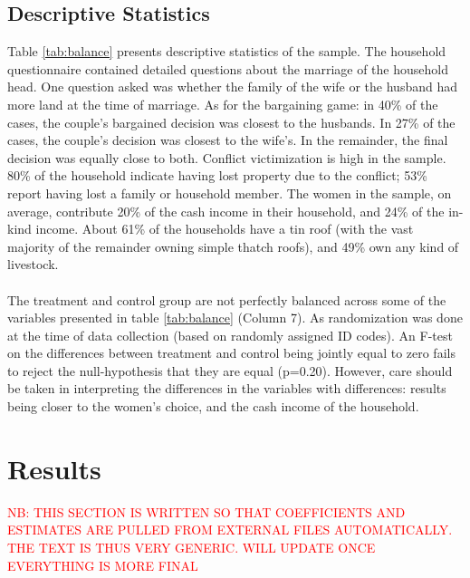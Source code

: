 \documentclass[11pt,a4paper]{scrartcl} %
\newcommand{\tableloc}{C:/Users/Koen/Dropbox/PhD/Papers/CongoGBV/Tables}
\begin{document}
\subsection*{Descriptive Statistics}
Table \ref{tab:balance} presents descriptive statistics of the sample. The household questionnaire contained detailed questions about the marriage of the household head. One question asked was whether the family of the wife or the husband had more land at the time of marriage.  As for the bargaining game: in 40\% of the cases, the couple's bargained decision was closest to the husbands. In 27\% of the cases, the couple's decision was closest to the wife's. In the remainder, the final decision was equally close to both. Conflict victimization is high in the sample. 80\% of the household indicate having lost property due to the conflict; 53\% report having lost a family or household member. The women in the sample, on average, contribute 20\% of the cash income in their household, and 24\% of the in-kind income. About 61\% of the households have a tin roof (with the vast majority of the remainder owning simple thatch roofs), and 49\% own any kind of livestock.

\paragraph{}
The treatment and control group are not perfectly balanced across some of the variables presented in table \ref{tab:balance} (Column 7). As randomization was done at the time of data collection (based on randomly assigned ID codes). An F-test on the differences between treatment and control being jointly equal to zero fails to reject the null-hypothesis that they are equal (p=0.20). However, care should be taken in interpreting the differences in the variables with differences: results being closer to the women's choice, and the cash income of the household. 





\section*{Results}
\textcolor{red}{NB: THIS SECTION IS WRITTEN SO THAT COEFFICIENTS AND ESTIMATES ARE PULLED FROM EXTERNAL FILES AUTOMATICALLY. THE TEXT IS THUS VERY GENERIC. WILL UPDATE ONCE EVERYTHING IS MORE FINAL}
\newcommand{\incid}[2]{\csvreader[filter strcmp={\key}{#1}]{\tableloc/incidence.csv}{key=\key,#2=\inc}{\inc}}
\end{document}
